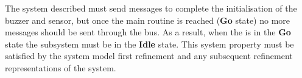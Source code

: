 The system described must send messages to complete the initialisation of the buzzer and sensor, but once the main routine is reached (\textbf{Go} state) no more messages should be sent through the \SPI bus. As a result, when the \ASIC is in the \textbf{Go} state the \SPI subsystem must be in the \textbf{Idle} state. This system property must be satisfied by the system model first refinement and any subsequent refinement representations of the system.




